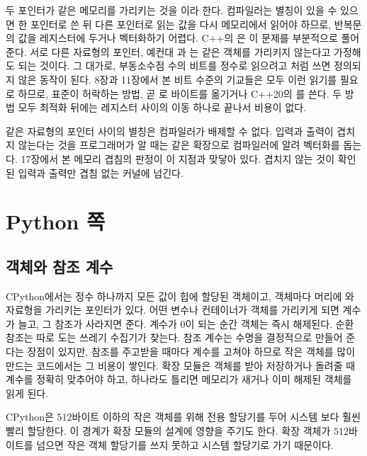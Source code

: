 두 포인터가 같은 메모리를 가리키는 것을 이라 한다. 컴파일러는 별칭이 있을 수 있으면 한 포인터로 쓴 뒤 다른 포인터로 읽는 값을 다시 메모리에서 읽어야 하므로, 반복문의 값을 레지스터에 두거나 벡터화하기 어렵다. C++의 은 이 문제를 부분적으로 풀어 준다. 서로 다른 자료형의 포인터, 예컨대 과 는 같은 객체를 가리키지 않는다고 가정해도 되는 것이다. 그 대가로, 부동소수점 수의 비트를 정수로 읽으려고 처럼 쓰면 정의되지 않은 동작이 된다. 8장과 11장에서 본 비트 수준의 기교들은 모두 이런 읽기를 필요로 하므로, 표준이 허락하는 방법, 곧 로 바이트를 옮기거나 C++20의 를 쓴다. 두 방법 모두 최적화 뒤에는 레지스터 사이의 이동 하나로 끝나서 비용이 없다.

같은 자료형의 포인터 사이의 별칭은 컴파일러가 배제할 수 없다. 입력과 출력이 겹치지 않는다는 것을 프로그래머가 알 때는  같은 확장으로 컴파일러에 알려 벡터화를 돕는다. 17장에서 본 메모리 겹침의 판정이 이 지점과 맞닿아 있다. 겹치지 않는 것이 확인된 입력과 출력만 겹침 없는 커널에 넘긴다.

\section{Python 쪽}
\label{sec:python-side}

\subsection{객체와 참조 계수}

CPython에서는 정수 하나까지 모든 값이 힙에 할당된 객체이고, 객체마다 머리에 와 자료형을 가리키는 포인터가 있다\cite{python-c-api}. 어떤 변수나 컨테이너가 객체를 가리키게 되면 계수가 늘고, 그 참조가 사라지면 준다. 계수가 $0$이 되는 순간 객체는 즉시 해제된다. 순환 참조는 따로 도는 쓰레기 수집기가 찾는다. 참조 계수는 수명을 결정적으로 만들어 준다는 장점이 있지만, 참조를 주고받을 때마다 계수를 고쳐야 하므로 작은 객체를 많이 만드는 코드에서는 그 비용이 쌓인다. 확장 모듈은 객체를 받아 저장하거나 돌려줄 때 계수를 정확히 맞추어야 하고, 하나라도 틀리면 메모리가 새거나 이미 해제된 객체를 읽게 된다.

CPython은 $512$바이트 이하의 작은 객체를 위해 전용 할당기를 두어 시스템 보다 훨씬 빨리 할당한다. 이 경계가 확장 모듈의 설계에 영향을 주기도 한다. 확장 객체가 $512$바이트를 넘으면 작은 객체 할당기를 쓰지 못하고 시스템 할당기로 가기 때문이다.

